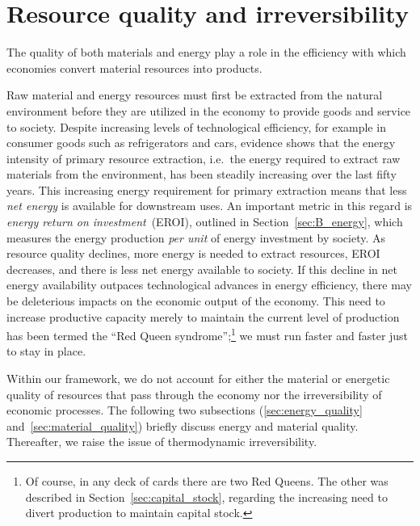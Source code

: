 \section{Resource quality and irreversibility}
\label{sec:resource_quality_and_irreversibility}


The quality of both materials
and energy play a role in the 
efficiency with which economies 
convert material resources into products.

Raw material and energy resources must first 
be extracted from the natural environment 
before they are utilized in the economy 
to provide goods and service to society. 
Despite increasing levels of technological efficiency, 
for example in consumer goods such as refrigerators and cars, 
evidence shows that 
the energy intensity of primary resource extraction, 
i.e.\ the energy required to extract raw materials 
from the environment, 
has been steadily increasing over 
the last fifty years.\cite{Hall1986, Mudd2010, Brandt2011} 
This increasing energy requirement for 
primary extraction means that 
less \textit{net energy} is available 
for downstream uses. 
An important metric in this regard is
\emph{energy return on investment}~(EROI),
outlined in Section~\ref{sec:B_energy},
which measures the energy production
\emph{per unit} of energy investment by society.
As resource quality declines,
more energy is needed to extract resources,
EROI decreases,
and there is less net energy available to society.
If this decline in net energy availability 
outpaces technological advances in energy efficiency, 
there may be deleterious impacts on the 
economic output of the economy.
This need to increase productive capacity 
merely to maintain
the current level of production has been termed 
the ``Red Queen syndrome'';\footnote{Of course,
	in any deck of cards there are two Red Queens.
	The other was described in Section~\ref{sec:capital_stock},
	regarding the increasing need to divert production
	to maintain capital stock.
	}
we must run faster and faster just to stay in place.\cite{Ross1988}



Within our framework, we do not account for either
the material or energetic quality of resources 
that pass through the economy nor the 
irreversibility of economic processes.
The following two subsections (\ref{sec:energy_quality}
and~\ref{sec:material_quality}) briefly discuss energy and material quality.
Thereafter, we raise the issue of thermodynamic irreversibility.



